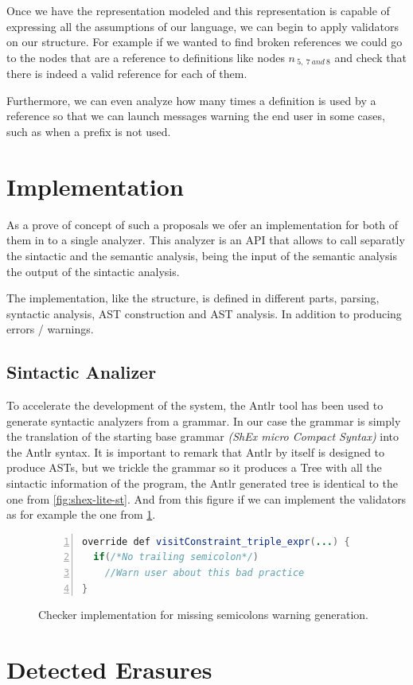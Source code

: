 Once we have the representation modeled and this representation is capable of expressing all the assumptions of our language,
we can begin to apply validators on our structure. For example if we wanted to find broken references we could go to the nodes
that are a reference to definitions like nodes $n_{\:5,\:7\:and\:8}$ and check that there is indeed a valid reference for each of them.

Furthermore, we can even analyze how many times a definition is used by a reference so that we can launch messages warning the end user
in some cases, such as when a prefix is not used.

\section{Implementation}
As a prove of concept of such a proposals we ofer an implementation for both of them in to a single analyzer. This analyzer is an API
that allows to call separatly the sintactic and the semantic analysis, being the input of the semantic analysis the output of the
sintactic analysis.

The implementation, like the structure, is defined in different parts, parsing, syntactic analysis, AST construction and AST analysis.
In addition to producing errors / warnings.

\subsection{Sintactic Analizer}
To accelerate the development of the system, the Antlr \cite{parr1995antlr} tool has been used to generate syntactic analyzers from a grammar.
In our case the grammar is simply the translation of the starting base grammar \textit{(ShEx micro Compact Syntax)} into the Antlr
syntax. It is important to remark that Antlr by itself is designed to produce ASTs, but we trickle the grammar so it produces
a Tree with all the sintactic information of the program, the Antlr generated tree is identical to the one from \cref{fig:shex-lite-st}.
And from this figure if we can implement the validators as for example the one from \cref{fig:checker-example}.

\begin{figure}
    \begin{lstlisting}[language=Java,numbers=left,basicstyle=\ttfamily\scriptsize]
override def visitConstraint_triple_expr(...) {
  if(/*No trailing semicolon*/)
    //Warn user about this bad practice
}
    \end{lstlisting}
    \caption[Checker implementation for missing semicolons warning generation]{Checker implementation for missing semicolons warning generation.}
    \label{fig:checker-example}
\end{figure}


\section{Detected Erasures}